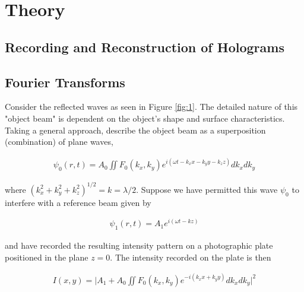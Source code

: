 \documentclass[12pt]{article}
\begin{document}
\begin{abstract}

 
\end{abstract}


\vspace{4cm}

\section{Theory} \label{sec:1}

\subsection{Recording and Reconstruction of Holograms}



\subsection{Fourier Transforms}

Consider the reflected waves as seen in Figure \ref{fig:1}. The detailed nature of this "object beam" is dependent on the object's shape and surface
characteristics. Taking a general approach, describe the object beam as a superposition (combination) of plane waves,

\vspace{-2ex}
\begin{gather*}
    \psi_0 (r,t) = A_0 \iint F_0 (k_x,k_y) e^{i(\omega t- k_x x- k_y y - k_z z)} dk_x dk_y 
\end{gather*}

where $(k_x^2 + k_y^2 + k_z^2)^{1/2} = k = \lambda / 2$. Suppose we have permitted this wave $\psi_0$ to interfere with a reference beam given by

\vspace{-2ex}
\begin{gather*}
    \psi_1 (r,t) = A_1 e^{i(\omega t - kz)}
\end{gather*}

and have recorded the resulting intensity pattern on a photographic plate positioned in the plane $z = 0$. The intensity recorded on the plate is then

\vspace{-2ex}
\begin{gather*}
    I(x,y) = \lvert A_1 + A_0 \iint F_0 (k_x,k_y) e^{-i(k_x x + k_y y)} dk_x dk_y \rvert^2
\end{gather*}
\end{document}
